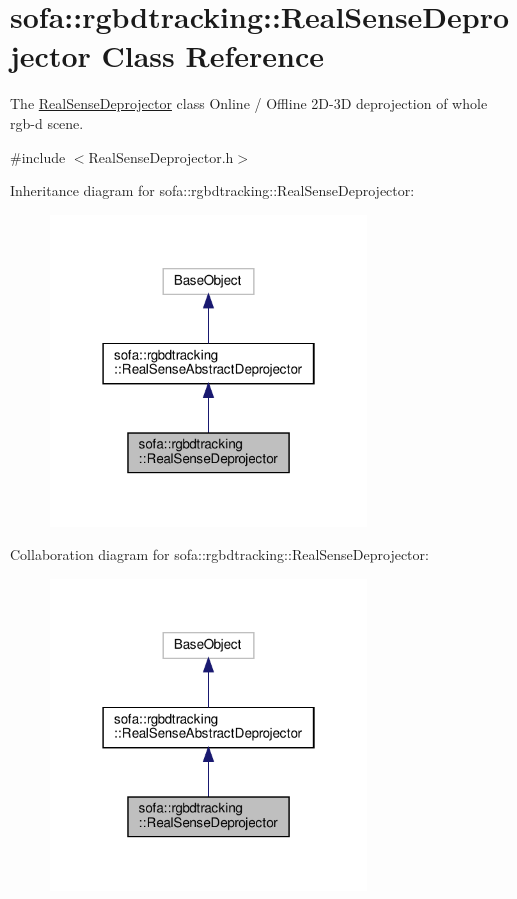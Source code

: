 \hypertarget{classsofa_1_1rgbdtracking_1_1_real_sense_deprojector}{}\section{sofa\+:\+:rgbdtracking\+:\+:Real\+Sense\+Deprojector Class Reference}
\label{classsofa_1_1rgbdtracking_1_1_real_sense_deprojector}


The \hyperlink{classsofa_1_1rgbdtracking_1_1_real_sense_deprojector}{Real\+Sense\+Deprojector} class Online / Offline 2\+D-\/3D deprojection of whole rgb-\/d scene.  




{\ttfamily \#include $<$Real\+Sense\+Deprojector.\+h$>$}



Inheritance diagram for sofa\+:\+:rgbdtracking\+:\+:Real\+Sense\+Deprojector\+:\nopagebreak
\begin{figure}[H]
\begin{center}
\leavevmode
\includegraphics[width=238pt]{classsofa_1_1rgbdtracking_1_1_real_sense_deprojector__inherit__graph}
\end{center}
\end{figure}


Collaboration diagram for sofa\+:\+:rgbdtracking\+:\+:Real\+Sense\+Deprojector\+:\nopagebreak
\begin{figure}[H]
\begin{center}
\leavevmode
\includegraphics[width=238pt]{classsofa_1_1rgbdtracking_1_1_real_sense_deprojector__coll__graph}
\end{center}
\end{figure}
